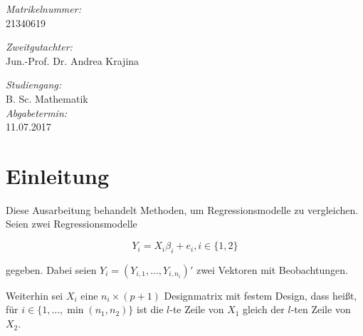 \documentclass[12pt,a4paper]{article}
\theoremstyle{definition}
\theoremstyle{definition}
\theoremstyle{definition}
\theoremstyle{definition}
\begin{document}
\begin{titlepage}
\begin{center}
\begin{minipage}{0.4\textwidth}
\begin{flushleft} \large
\emph{Matrikelnummer:}\\
21340619\\
\end{flushleft}
\end{minipage}
\hfill
\begin{minipage}{0.4\textwidth}
\begin{flushright} \large
\emph{Zweitgutachter:}\\
Jun.-Prof. Dr. Andrea Krajina\\
\end{flushright}
\end{minipage}
\begin{flushleft}
\begin{minipage}{0.4\textwidth}
\begin{flushleft} \large
\emph{Studiengang:}\\
B. Sc. Mathematik\\
\emph{Abgabetermin:}\\
11.07.2017\\
\end{flushleft}
\end{minipage}
\end{flushleft}
\hfill


\end{center}

\newpage 
\thispagestyle{empty}
\quad 
\newpage
\end{titlepage}
\newpage

\tableofcontents
\newpage
\thispagestyle{empty}
\quad 


\section*{Einleitung}
Diese Ausarbeitung behandelt Methoden, um Regressionsmodelle zu vergleichen. Seien zwei Regressionsmodelle 

\begin{equation*}
Y_i = X_i \beta_i + e_i , i \in \{1,2\}
\end{equation*}

gegeben. Dabei seien $Y_i=(Y_{i,1}, \ldots, Y_{i,n_i})'$ zwei Vektoren mit Beobachtungen.
 
Weiterhin sei $X_i$ eine $n_i \times (p+1)$ Designmatrix mit festem Design, dass heißt, für $i \in \{ 1, \ldots, \min(n_1, n_2)\}$ ist die $l$-te Zeile von $X_1$ gleich der $l$-ten Zeile von $X_2$.
\end{document}

